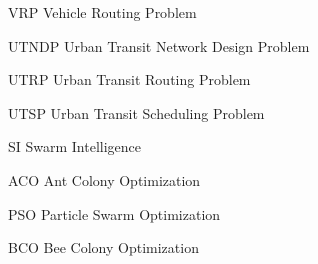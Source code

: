 \begin{abbrv}
\item[VRP] Vehicle Routing Problem
\item[UTNDP] Urban Transit Network Design Problem
\item[UTRP] Urban Transit Routing Problem
\item[UTSP] Urban Transit Scheduling Problem
\item[SI] Swarm Intelligence
\item[ACO] Ant Colony Optimization
\item[PSO] Particle Swarm Optimization
\item[BCO] Bee Colony Optimization
\end{abbrv}
 
 

 
 
 
 
